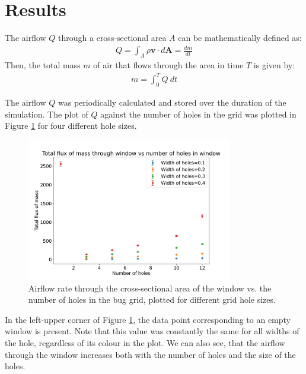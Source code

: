 \section{Results} \label{section: results}
The airflow $Q$ through a cross-sectional area $A$ can be mathematically defined as:
\begin{gather}
    Q = \int_A \rho \mathbf{v} \cdot d\mathbf{A} = \frac{dm}{dt}
\end{gather}
Then, the total mass $m$ of air that flows through the area in time $T$ is given by:
\begin{gather}
    m = \int_0^T Q ~dt
\end{gather}

The airflow $Q$ was periodically calculated and stored over the duration of the simulation. The plot of $Q$ against the number of holes in the grid was plotted in Figure \ref{fig: flow_rate} for four different hole sizes.
\begin{figure}[H]
    \centering
    \includegraphics[width=0.8\textwidth]{figures/flux_vs_holes.pdf}
    \caption{Airflow rate through the cross-sectional area of the window vs. the number of holes in the bug grid, plotted for different grid hole sizes.}
    \label{fig: flow_rate}
\end{figure}
In the left-upper corner of Figure \ref{fig: flow_rate}, the data point corresponding to an empty window is present. Note that this value was constantly the same for all widths of the hole, regardless of its colour in the plot. We can also see, that the airflow through the window increases both with the number of holes and the size of the holes. \\

